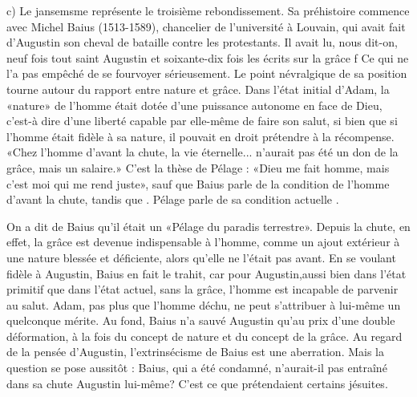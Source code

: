 c)	Le	jansemsme	représente	le	troisième	rebondissement.	Sa préhistoire commence avec Michel Baius (1513-1589), chancelier de l'université à Louvain, qui avait fait d'Augustin son cheval de bataille contre les protestants. Il avait lu, nous dit-on, neuf fois tout saint Augustin et soixante-dix fois les écrits sur la grâce f Ce qui ne l'a pas empêché de se fourvoyer sérieusement. Le point névralgique de sa position tourne autour du rapport entre nature et grâce. Dans l'état initial d'Adam, la «nature» de l'homme était dotée d'une puissance autonome en face de Dieu, c'est-à­ dire d'une liberté capable par elle-même de faire son salut, si bien que si l'homme était fidèle à sa nature, il pouvait en droit prétendre à la récompense. «Chez l'homme d'avant la chute, la vie éternelle... n'aurait pas été un don de la grâce, mais un salaire.» C'est la thèse de Pélage : «Dieu me fait homme, mais c'est moi qui me rend juste», sauf que Baius parle de la condition de l'homme	d'avant la chute, tandis que . Pélage parle de sa condition actuelle .

On a dit de Baius qu'il était un «Pélage  du  paradis  terrestre». Depuis la chute, en effet, la grâce est devenue indispensable à l'homme, comme un ajout extérieur à une nature blessée et déficiente, alors qu'elle ne l'était pas avant. En se voulant fidèle à Augustin, Baius en fait le trahit, car pour Augustin,aussi bien dans l'état primitif que dans l'état actuel, sans la grâce, l'homme est incapable de parvenir au salut. Adam, pas plus que l'homme déchu, ne peut s'attribuer à lui-même un quelconque mérite.  	Au fond, Baius n'a sauvé Augustin qu'au prix d'une double déformation, à la fois du concept de nature et du concept de la grâce. Au regard de la pensée d'Augustin, l'extrinsécisme de Baius est une aberration. Mais la question se pose aussitôt : Baius, qui a été condamné, n'aurait-il pas entraîné dans sa chute Augustin lui-même? C'est ce que prétendaient certains jésuites.


